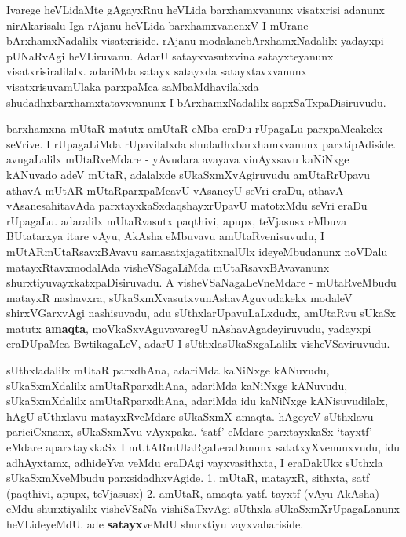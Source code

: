 \centerline{}

\centerline{}

\begin{artha}
 Ivarege heVLidaMte gAgayxRnu heVLida barxhamxvanunx visatxrisi
 adanunx nirAkarisalu Iga rAjanu heVLida barxhamxvanenxV I mUrane
 bArxhamxNadalilx visatxriside. rAjanu modalanebArxhamxNadalilx
 yadayxpi pUNaRvAgi heVLiruvanu. AdarU satayxvasutxvina satayxteyanunx
 visatxrisiralilalx. adariMda satayx satayxda satayxtavxvanunx
 visatxrisuvamUlaka parxpaMca saMbaMdhavilalxda
 shudadhxbarxhamxtatavxvanunx I bArxhamxNadalilx sapxSaTxpaDisiruvudu.
\end{artha}

\newpage
\centerline{}

\begin{artha}
barxhamxna mUtaR matutx amUtaR eMba eraDu rUpagaLu parxpaMcakekx
seVrive. I rUpagaLiMda rUpavilalxda shudadhxbarxhamxvanunx
parxtipAdiside. avugaLalilx  mUtaRveMdare - yAvudara avayava vinAyxsavu
kaNiNxge kANuvado adeV mUtaR, adalalxde sUkaSxmXvAgiruvudu
amUtaRrUpavu athavA mUtAR  mUtaRparxpaMcavU vAsaneyU seVri eraDu, athavA
vAsanesahitavAda parxtayxkaSxdaqshayxrUpavU matotxMdu seVri eraDu
rUpagaLu. adaralilx  mUtaRvasutx paqthivi, apupx, teVjasusx eMbuva
BUtatarxya itare vAyu, AkAsha eMbuvavu amUtaRvenisuvudu, I
mUtARmUtaRsavxBAvavu samasatxjagatitxnalUlx ideyeMbudanunx noVDalu
matayxRtavxmodalAda visheVSagaLiMda mUtaRsavxBAvavanunx
shurxtiyuvayxkatxpaDisiruvadu. A visheVSaNagaLeVneMdare - mUtaRveMbudu
matayxR nashavxra, sUkaSxmXvasutxvunAshavAguvudakekx modaleV
shirxVGarxvAgi nashisuvadu, adu sUthxlarUpavuLaLxdudx, amUtaRvu sUkaSx
matutx \textbf{amaqta}, moVkaSxvAguvavaregU nAshavAgadeyiruvudu,
yadayxpi eraDUpaMca BwtikagaLeV, adarU I sUthxlasUkaSxgaLalilx
visheVSaviruvudu.
\end{artha}

\begin{artha}
sUthxladalilx mUtaR parxdhAna, adariMda kaNiNxge kANuvudu,
sUkaSxmXdalilx amUtaRparxdhAna, adariMda kaNiNxge kANuvudu,
sUkaSxmXdalilx amUtaRparxdhAna, adariMda idu kaNiNxge kANisuvudilalx,
hAgU sUthxlavu matayxRveMdare sUkaSxmX amaqta. hAgeyeV sUthxlavu
pariciCxnanx, sUkaSxmXvu vAyxpaka. {`satf'} eMdare parxtayxkaSx
{`tayxtf'}  eMdare aparxtayxkaSx I mUtARmUtaRgaLeraDanunx
satatxyXvenunxvudu, idu adhAyxtamx, adhideYva veMdu eraDAgi
vayxvasithxta, I eraDakUkx sUthxla sUkaSxmXveMbudu parxsidadhxvAgide.
1. mUtaR, matayxR, sithxta, satf (paqthivi, apupx, teVjasusx)
2. amUtaR, amaqta yatf. tayxtf (vAyu AkAsha)
eMdu shurxtiyalilx visheVSaNa vishiSaTxvAgi sUthxla
sUkaSxmXrUpagaLanunx heVLideyeMdU. ade \textbf{satayx}veMdU shurxtiyu vayxvahariside.
\end{artha}

